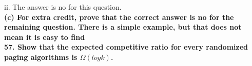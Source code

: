 \documentclass{article}
\begin{document}
ii. The answer is no for this question. \\ \newline
\textbf{(c) For extra credit, prove that the correct answer is no for the remaining question. There is a simple example, but that does not mean it is easy to find} \\ \newline
\textbf{57. Show that the expected competitive ratio for every randomized paging algorithms is
$\Omega(logk)$.}
\end{document}
